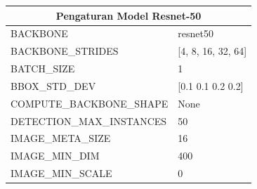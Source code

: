 \begin{longtable}[h!]{|l|l|}
		\hline
		\multicolumn{2}{|c|}{\textbf{Pengaturan Model Resnet-50}}                                                                                                                                                                         \\ \hline
		BACKBONE                        & resnet50                                                                                                                                                                              \\ \hline
		BACKBONE\_STRIDES               & {[}4, 8, 16, 32, 64{]}                                                                                                                                                                 \\ \hline
		BATCH\_SIZE                     & 1                                                                                                                                                                                      \\ \hline
		BBOX\_STD\_DEV                  & {[}0.1 0.1 0.2 0.2{]}                                                                                                                                                                  \\ \hline
		COMPUTE\_BACKBONE\_SHAPE        & None                                                                                                                                                                                   \\ \hline
		DETECTION\_MAX\_INSTANCES       &	 50                                                    	\\ \hline
		IMAGE\_META\_SIZE               & 16                                                                                                                                                                                     \\ \hline
		IMAGE\_MIN\_DIM                 & 400                                                                                                                                                                                    \\ \hline
		IMAGE\_MIN\_SCALE               & 0                                                                                                                                                                                      \\ \hline

\end{longtable}
